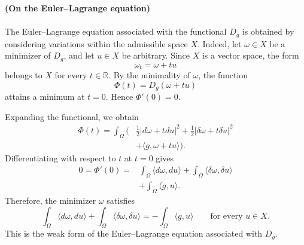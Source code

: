\begin{remark}\textbf{(On the Euler--Lagrange equation)}
\\\\ The Euler--Lagrange equation associated with the functional $D_g$ is
obtained by considering variations within the admissible space $X$.
Indeed, let $\omega\in X$ be a minimizer of $D_g$, and let $u\in X$
be arbitrary. Since $X$ is a vector space, the form
\[
    \omega_t=\omega+tu
\]
belongs to $X$ for every $t\in\mathbb{R}$. By the minimality of
$\omega$, the function
\[
    \Phi(t)=D_g(\omega+tu)
\]
attains a minimum at $t=0$. Hence $\Phi'(0)=0$.

Expanding the functional, we obtain
\[
\begin{aligned}
    \Phi(t)
    =\int_\Omega\bigg(
        &\frac12|d\omega+tdu|^2
        +\frac12|\delta\omega+t\delta u|^2\\
        &+\langle g,\omega+tu\rangle
    \bigg).
\end{aligned}
\]
Differentiating with respect to $t$ at $t=0$ gives
\[
\begin{aligned}
    0=\Phi'(0)
    ={}&
    \int_\Omega\langle d\omega,du\rangle
    +
    \int_\Omega\langle\delta\omega,\delta u\rangle\\
    &+
    \int_\Omega\langle g,u\rangle.
\end{aligned}
\]
Therefore, the minimizer $\omega$ satisfies
\[
    \int_\Omega\langle d\omega,du\rangle
    +
    \int_\Omega\langle\delta\omega,\delta u\rangle
    =
    -\int_\Omega\langle g,u\rangle
    \qquad\text{for every }u\in X.
\]
This is the weak form of the Euler--Lagrange equation associated
with $D_g$.
    
\end{remark}

